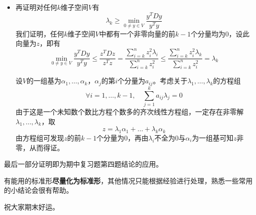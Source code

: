 \documentclass[a4paper,UTF8,fontset=windows]{ctexart}
\newcommand*{\note}{\noindent *}
\begin{document}
\begin{enumerate}
\begin{itemize}
        \item 再证明对任何$k$维子空间$V$有
        $$\lambda_k\ge\min_{0\ne y\in V}\frac{y^TDy}{y^Ty}$$
        我们证明，任何$k$维子空间$V$中都有一个非零向量的前$k-1$个分量均为0，设此向量为$z$，即有
        $$\min_{0\ne y\in V}\frac{y^TDy}{y^Ty}\le\frac{z^TDz}{z^Tz}=\frac{\sum_{i=k}^nz_i^2\lambda_i}{\sum_{i=k}^nz_i^2}\le\frac{\sum_{i=k}^nz_i^2\lambda_k}{\sum_{i=k}^nz_i^2}=\lambda_k$$

        设$V$的一组基为$\alpha_1,\dots,\alpha_k$，$\alpha_j$的第$i$个分量为$a_{ij}$。考虑关于$\lambda_1,\dots,\lambda_k$的方程组
        $$\forall i=1,\dots,k-1,\quad\sum_{j=1}^ka_{ij}\lambda_j=0$$
        由于这是一个未知数个数比方程个数多的齐次线性方程组，一定存在非零解$\lambda_1,\dots,\lambda_k$，取
        $$z=\lambda_1\alpha_1+\dots+\lambda_k\alpha_k$$
        由方程组可发现$z$的前$k-1$个分量为0，再由$\lambda_i$不全为0与$\alpha_i$为一组基可知$z$非零，从而得证。
    \end{itemize}

    \note 最后一部分证明即为期中复习题第四题结论的应用。
\end{enumerate}

\note 有能用的标准形\textbf{尽量化为标准形}，其他情况只能根据经验进行处理，熟悉一些常用的小结论会很有帮助。

\note 祝大家期末好运。
\end{document}

